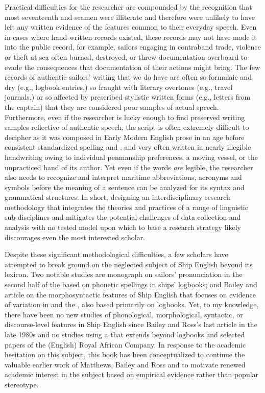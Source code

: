 Practical difficulties for the researcher are compounded by the recognition that most seventeenth and  seamen were illiterate \citep[167]{Kelly2006} and therefore were unlikely to have left any written evidence of the features common to their everyday speech. Even in cases where hand-written records existed, these records may not have made it into the public record, for example, sailors engaging in contraband trade, violence or theft at sea often burned, destroyed, or threw documentation overboard to evade the consequences that documentation of their actions might bring. The few records of authentic sailors’ writing that we do have are often so formulaic and dry (e.g., logbook entries,) so fraught with literary overtones (e.g., travel journals,) or so affected by prescribed stylistic written forms (e.g., letters from the captain) that they are considered poor samples of actual speech. Furthermore, even if the researcher is lucky enough to find preserved writing samples reflective of authentic speech, the script is often extremely difficult to decipher as it was composed in Early Modern English prose in an age before consistent standardized spelling and , and very often written in nearly illegible handwriting owing to individual penmanship preferences, a moving vessel, or the unpracticed hand of its author. Yet even if the words \textit{are} legible, the researcher also needs to recognize and interpret maritime abbreviations, acronyms and symbols before the meaning of a sentence can be analyzed for its syntax and grammatical structures. In short, designing an interdisciplinary research methodology that integrates the theories and practices of a range of linguistic sub-disciplines and mitigates the potential challenges of data collection and analysis with no tested model upon which to base a research strategy likely discourages even the most interested scholar. 



Despite these significant methodological difficulties, a few scholars have attempted to break ground on the neglected subject of Ship English beyond its lexicon. Two notable studies are  monograph on sailors’ pronunciation in the second half of the  based on phonetic spellings in ships’ logbooks; and Bailey and  article on the morphosyntactic features of Ship English that focuses on evidence of variation in  and the , also based primarily on logbooks. Yet, to my knowledge, there have been no new studies of phonological, morphological, syntactic, or discourse-level features in Ship English since Bailey and Ross’s last article in the late 1980s and no studies using a  that extends beyond logbooks and selected papers of the (English) Royal African Company. In response to the academic hesitation on this subject, this book has been conceptualized to continue the valuable earlier work of Matthews, Bailey and Ross and to motivate renewed academic interest in the subject based on empirical evidence rather than popular stereotype.  



